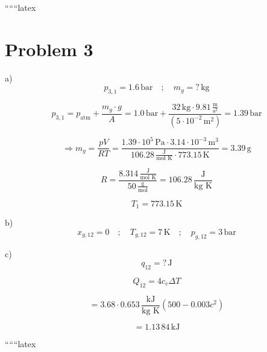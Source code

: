 
``````latex

\section*{Problem 3}

a) \\
\[ p_{3,1} = 1.6 \, \text{bar} \quad ; \quad m_g = ? \, \text{kg} \]

\[ p_{3,1} = p_{\text{atm}} + \frac{m_g \cdot g}{A} = 1.0 \, \text{bar} + \frac{32 \, \text{kg} \cdot 9.81 \, \frac{\text{m}}{\text{s}^2}}{(5 \cdot 10^{-2} \, \text{m}^2)} = 1.39 \, \text{bar} \]

\[
\Rightarrow m_g = \frac{pV}{RT} = \frac{1.39 \cdot 10^5 \, \text{Pa} \cdot 3.14 \cdot 10^{-3} \, \text{m}^3}{106.28 \, \frac{\text{J}}{\text{mol K}} \cdot 773.15 \, \text{K}} = 3.39 \, \text{g}
\]

\[
R = \frac{8.314 \, \frac{\text{J}}{\text{mol K}}}{50 \, \frac{\text{g}}{\text{mol}}} = 106.28 \, \frac{\text{J}}{\text{kg K}}
\]

\[
T_1 = 773.15 \, \text{K}
\]

b) \\
\[ x_{g,12} = 0 \quad ; \quad T_{g,12} = 7 \, \text{K} \quad ; \quad p_{g,12} = 3 \, \text{bar} \]

c) \\
\[ q_{12} = ? \, \text{J} \]

\[
Q_{12} = 4 c_v \Delta T
\]

\[
= 3.68 \cdot 0.653 \, \frac{\text{kJ}}{\text{kg K}} \left(500 - 0.003c^2\right)
\]

\[
= 1.13 \, 84 \, \text{kJ}
\]

``````latex


